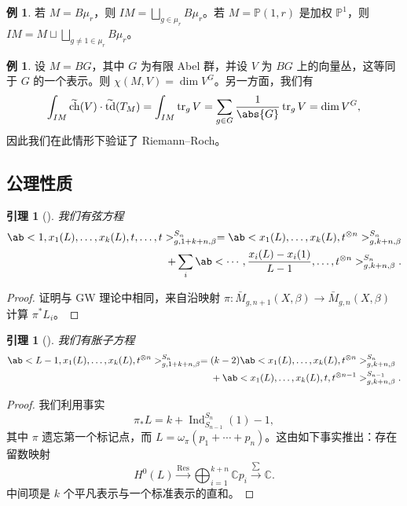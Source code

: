 \documentclass{amsart}
\newtheorem{lem}[thm]{引理}
\theoremstyle{definition}
\newtheorem{exm}[thm]{例}
\theoremstyle{remark}
\theoremstyle{plain}
\theoremstyle{definition}
\theoremstyle{remark}
\newcommand{\C}{\mathbb{C}}
\renewcommand{\P}{\mathbb{P}}
\newcommand{\on}[1]{\operatorname{#1}}
\newcommand{\wt}[1]{\widetilde{#1}}
\newcommand{\1}{\mathbf{1}}
\newcommand{\2}{\mathbf{2}}
\newcommand{\3}{\mathbf{3}}
\begin{document}
\begin{exm}
    若 \(M = B\mu_r\)，则 \(IM = \bigsqcup_{g \in \mu_r} B \mu_r\)。若 \(M = \P(1, r)\) 是加权 \(\P^1\)，则 \(IM = M \sqcup \bigsqcup_{g \neq 1 \in \mu_r} B\mu_r\)。    
\end{exm}

\begin{exm}
    设 \(M = BG\)，其中 \(G\) 为有限 Abel 群，并设 \(V\) 为 \(BG\) 上的向量丛，这等同于 \(G\) 的一个表示。则 \(\chi(M, V) = \dim V^G\)。另一方面，我们有
    \[ \int_{IM} \wt{\on{ch}}(V) \cdot \wt{\on{td}}(T_M) = \int_{IM} \on{tr}_g V = \sum_{g \in G} \frac{1}{\abs{G}} \on{tr}_g V = \dim V^G, \]
    因此我们在此情形下验证了 Riemann–Roch。
\end{exm}

\subsection{公理性质}%
\label{sub:Axiomatic properties}

\begin{lem}[{\cite{GiventalK7}}]
    我们有\textit{弦方程}
    \begin{align*}
        \ab< 1, x_1(L), \ldots, x_k(L), t, \ldots, t >_{g, 1+k+n, \beta}^{S_n} = \ab<x_1(L), \ldots, x_k(L), t^{\otimes n}>^{S_n}_{g,k+n,\beta} \\
        + \sum_i \ab< \cdots, \frac{x_i(L) - x_i(1)}{L-1}, \ldots, t^{\otimes n}>^{S_n}_{g,k+n,\beta}. 
    \end{align*}
\end{lem}

\begin{proof}
    证明与 GW 理论中相同，来自沿映射 \(\pi \colon\bar{M}_{g,n+1}(X,\beta) \to \bar{M}_{g,n}(X,\beta)\) 计算 \(\pi^* L_i\)。
\end{proof}

\begin{lem}[{\cite{GiventalK7}}]
    我们有\textit{胀子方程}
    \begin{align*}
        \ab<L-1, x_1(L), \ldots, x_k(L), t^{\otimes n}>_{g,1+k+n,\beta}^{S_n} ={}& (k-2)\ab<x_1(L), \ldots, x_k(L), t^{\otimes n}>_{g,k+n,\beta}^{S_n} \\
        &+ \ab<x_1(L), \ldots, x_k(L), t, t^{\otimes n-1}>_{g,k+n,\beta}^{S_{n-1}}.
    \end{align*}
\end{lem}

\begin{proof}
    我们利用事实
    \[ \pi_* L = k + \on{Ind}_{S_{n-1}}^{S_n}(1) - 1, \]
    其中 \(\pi\) 遗忘第一个标记点，而 \(L = \omega_{\pi} (p_1 + \cdots + p_n)\)。这由如下事实推出：存在留数映射
    \[ H^0(L) \xrightarrow{\on{Res}} \bigoplus_{i=1}^{k+n} \C p_i \xrightarrow{\sum} \C. \]
    中间项是 \(k\) 个平凡表示与一个标准表示的直和。
\end{proof}
\end{document}
